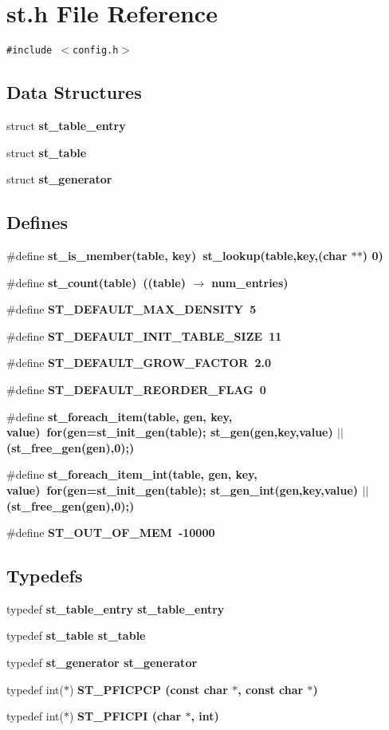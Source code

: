 \section{st.h File Reference}
\label{st_8h}
{\tt \#include $<$config.h$>$}\par
\subsection*{Data Structures}
\begin{CompactItemize}
\item 
struct \bf{st\_\-table\_\-entry}
\item 
struct \bf{st\_\-table}
\item 
struct \bf{st\_\-generator}
\end{CompactItemize}
\subsection*{Defines}
\begin{CompactItemize}
\item 
\#define \bf{st\_\-is\_\-member}(table, key)~st\_\-lookup(table,key,(char $\ast$$\ast$) 0)
\item 
\#define \bf{st\_\-count}(table)~((table) $\rightarrow$ num\_\-entries)
\item 
\#define \bf{ST\_\-DEFAULT\_\-MAX\_\-DENSITY}~5
\item 
\#define \bf{ST\_\-DEFAULT\_\-INIT\_\-TABLE\_\-SIZE}~11
\item 
\#define \bf{ST\_\-DEFAULT\_\-GROW\_\-FACTOR}~2.0
\item 
\#define \bf{ST\_\-DEFAULT\_\-REORDER\_\-FLAG}~0
\item 
\#define \bf{st\_\-foreach\_\-item}(table, gen, key, value)~for(gen=st\_\-init\_\-gen(table); st\_\-gen(gen,key,value) $|$$|$ (st\_\-free\_\-gen(gen),0);)
\item 
\#define \bf{st\_\-foreach\_\-item\_\-int}(table, gen, key, value)~for(gen=st\_\-init\_\-gen(table); st\_\-gen\_\-int(gen,key,value) $|$$|$ (st\_\-free\_\-gen(gen),0);)
\item 
\#define \bf{ST\_\-OUT\_\-OF\_\-MEM}~-10000
\end{CompactItemize}
\subsection*{Typedefs}
\begin{CompactItemize}
\item 
typedef \bf{st\_\-table\_\-entry} \bf{st\_\-table\_\-entry}
\item 
typedef \bf{st\_\-table} \bf{st\_\-table}
\item 
typedef \bf{st\_\-generator} \bf{st\_\-generator}
\item 
typedef int($\ast$) \bf{ST\_\-PFICPCP} (const char $\ast$, const char $\ast$)
\item 
typedef int($\ast$) \bf{ST\_\-PFICPI} (char $\ast$, int)
\end{CompactItemize}
